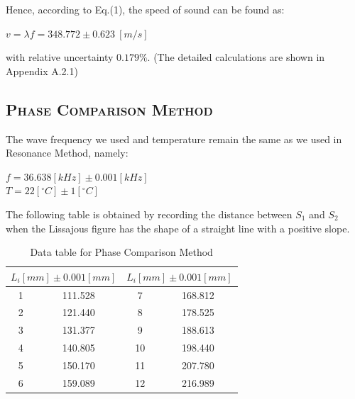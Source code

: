 \documentclass[a4paper,12pt]{article}
\begin{document}

Hence, according to Eq.(1), the speed of sound can be found as:

\begin{center}
$ v = \lambda f = 348.772 \pm 0.623~[m/s]$
\end{center}

with relative uncertainty $ 0.179\% $. (The detailed calculations are shown in Appendix A.2.1)

\subsection{\textsc{Phase Comparison Method}}
The wave frequency we used and temperature remain the same as we used in Resonance Method, namely:

\begin{center}
$f = 36.638 [kHz] \pm 0.001 [kHz]$\\
[3 mm]
$T = 22[^{\circ}C] \pm 1[^{\circ}C]$
\end{center}

The following table is obtained by recording the distance between \textit{$S_1$} and \textit{$S_2$} when the Lissajous figure has the shape of a straight line with a positive slope.

\begin{table}[h]
\begin{center}
\begin{tabular}{|c|c||c|c|}
\hline
\multicolumn{2}{|c||}{$L_i[mm] \pm 0.001[mm]$} & \multicolumn{2}{c|}{$L_i[mm] \pm 0.001[mm]$}\\
\hline
1 & 111.528 & 7 & 168.812 \\
2 & 121.440 & 8 & 178.525 \\
3 & 131.377 & 9 & 188.613 \\
4 & 140.805 & 10 & 198.440 \\
5 & 150.170 & 11 & 207.780 \\
6 & 159.089 & 12 & 216.989 \\
\hline
\end{tabular}
\caption{Data table for Phase Comparison Method}
\end{center}
\end{table}
\end{document}
